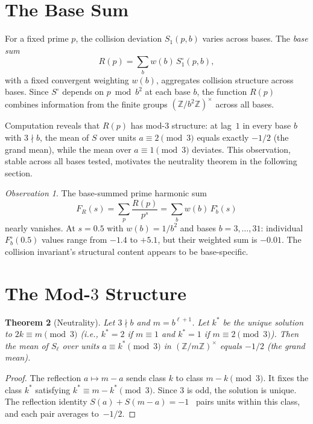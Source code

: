 \documentclass[12pt]{amsart}
\newtheorem{theorem}{Theorem}
\theoremstyle{definition}
\theoremstyle{remark}
\newtheorem{observation}[theorem]{Observation}
\begin{document}
\section{The Base Sum}

For a fixed prime $p$, the collision deviation
$S_1(p, b)$ varies across bases. The \emph{base sum}
\[
R(p) = \sum_b w(b)\, S^{\circ}_1(p, b),
\]
with a fixed convergent weighting $w(b)$, aggregates
collision structure across bases. Since $S^{\circ}$
depends on $p \bmod b^2$ at each base $b$, the function
$R(p)$ combines information from the finite groups
$(\mathbb{Z}/b^2\mathbb{Z})^{\times}$ across all bases.

Computation reveals that $R(p)$ has mod-$3$ structure:
at lag~$1$ in every base $b$ with $3 \nmid b$, the
mean of $S$ over units $a \equiv 2 \pmod{3}$ equals
exactly $-1/2$ (the grand mean), while the mean over
$a \equiv 1 \pmod{3}$ deviates. This observation,
stable across all bases tested, motivates the
neutrality theorem in the following section.

\begin{observation}
The base-summed prime harmonic sum
\[
F_R(s) = \sum_p \frac{R(p)}{p^s}
= \sum_b w(b)\, F^{\circ}_b(s)
\]
nearly vanishes. At $s = 0.5$ with
$w(b) = 1/b^2$ and bases $b = 3, \ldots, 31$:
individual $F^{\circ}_b(0.5)$ values range from
$-1.4$ to $+5.1$, but their weighted sum is $-0.01$.
The collision invariant's structural content appears
to be base-specific.
\end{observation}

\section{The Mod-$3$ Structure}

\begin{theorem}[Neutrality]\label{thm:neutral}
Let $3 \nmid b$ and $m = b^{\ell+1}$. Let
$k^{*}$ be the unique solution to
$2k \equiv m \pmod{3}$ (i.e., $k^{*} = 2$ if
$m \equiv 1$ and $k^{*} = 1$ if $m \equiv 2
\pmod{3}$). Then the mean of $S_{\ell}$ over units
$a \equiv k^{*} \pmod{3}$ in
$(\mathbb{Z}/m\mathbb{Z})^{\times}$ equals $-1/2$
(the grand mean).
\end{theorem}

\begin{proof}
The reflection $a \mapsto m - a$ sends class $k$ to
class $m - k \pmod{3}$. It fixes the class $k^{*}$
satisfying $k^{*} \equiv m - k^{*} \pmod{3}$. Since
$3$ is odd, the solution is unique. The reflection
identity $S(a) + S(m{-}a) = -1$~\cite{paperA} pairs
units within this class, and each pair averages
to~$-1/2$.
\end{proof}
\end{document}
